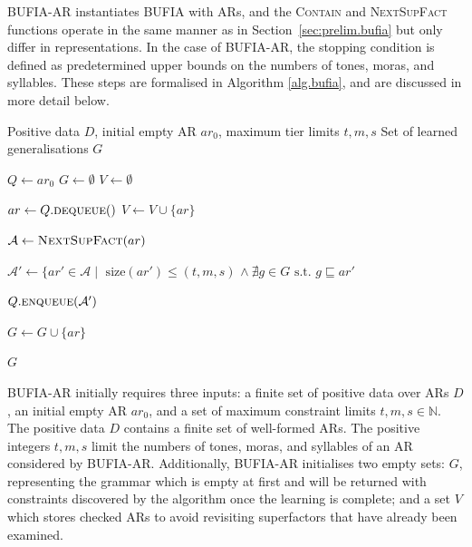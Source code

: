 BUFIA-AR instantiates BUFIA with ARs, and the \textsc{Contain} and
\textsc{NextSupFact} functions operate in the same manner as in
Section~\ref{sec:prelim.bufia} but only differ in representations.  In
the case of BUFIA-AR, the stopping condition is defined as
predetermined upper bounds on the numbers of tones, moras, and
syllables. These steps are formalised in Algorithm \ref{alg.bufia},
and are discussed in more detail below.  

\begin{algorithm}
	\caption{\textsc{Bottom-Up Factorial Inference Algorithm over Autosegmental Representations}}
	\label{alg.bufia}
	\begin{algorithmic}[1]
		\Require Positive data $D$, initial empty AR $ar_0$, maximum tier limits $t, m, s$
		\Ensure Set of learned generalisations $G$
		
		\State $Q \gets {ar_0}$ %
		\State $G \gets \emptyset$ %
		\State $V \gets \emptyset$ %
		
		\State $ar \gets Q.\textsc{dequeue}()$ \label{dequeue}
		\State $V \gets V \cup \{ar\}$
		
		\State $\mathcal{A} \gets \textsc{NextSupFact}(ar)$
		
		\State $\mathcal{A}' \gets \{ ar' \in \mathcal{A} \mid$
  		$\text{size}(ar') \le (t, m, s)$
		$\land\ \nexists g \in G \text{ s.t. } g \sqsubseteq ar'$
		
		\State $Q.\textsc{enqueue}(\mathcal{A}')$ \label{enqueue}

		\Else
		\State $G \gets G \cup \{ar\}$
		\EndIf
		\EndIf
		\EndWhile
	
		\State \Return $G$
	\end{algorithmic}
\end{algorithm}


BUFIA-AR initially requires three inputs: a finite set of positive data
over ARs $D$, an initial empty AR \(ar_0\), and a set of maximum constraint 
limits \(t, m, s \in\mathbb{N}\). The positive data \( D \) contains 
a finite set of well-formed ARs. The positive integers \(t, m, s\) 
limit the numbers of tones, moras, and syllables of an AR considered by BUFIA-AR. 
Additionally, BUFIA-AR initialises two empty sets: \( G \), representing the 
grammar which is empty at first and will be returned with constraints 
discovered by the algorithm once the learning is complete; and a set \( 
V \) which stores checked ARs to avoid revisiting
superfactors that have already been examined.

